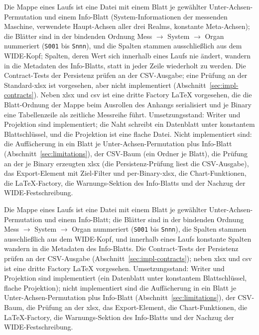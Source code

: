 \begin{nurlang}
Die Mappe eines Laufs ist eine Datei mit einem Blatt je gewählter Unter-Achsen-Permutation und einem
Info-Blatt (System-Informationen der messenden Maschine, verwendete Haupt-Achsen aller drei Realms,
konstante Meta-Achsen); die Blätter sind in der bindenden Ordnung Mess $\to$ System $\to$ Organ
nummeriert (\texttt{S001} bis \texttt{Snnn}), und die Spalten stammen ausschließlich aus dem
WIDE-Kopf; Spalten, deren Wert sich innerhalb eines Laufs nie ändert, wandern in die Metadaten des
Info-Blatts, statt in jeder Zeile wiederholt zu werden. Die Contract-Tests der Persistenz prüfen an der
CSV-Ausgabe; eine Prüfung an der Standard-xlsx ist vorgesehen, aber nicht implementiert
(Abschnitt~\ref{sec:impl-contracts}). Neben xlsx und csv ist
eine dritte Factory LaTeX vorgesehen, die die Blatt-Ordnung der Mappe beim Ausrollen des Anhangs
serialisiert und je Binary eine Tabellenzeile als zeitliche Messreihe führt. Umsetzungsstand:
Writer und Projektion sind implementiert; die Naht schreibt ein Datenblatt unter konstantem Blattschlüssel,
und die Projektion ist eine flache Datei. Nicht implementiert sind: die Auffächerung in ein Blatt je
Unter-Achsen-Permutation plus Info-Blatt (Abschnitt~\ref{sec:limitations}), der CSV-Baum (ein Ordner je
Blatt), die Prüfung an der je Binary erzeugten xlsx (die Persistenz-Prüfung liest die CSV-Ausgabe), das
Export-Element mit Ziel-Filter und per-Binary-xlsx, die Chart-Funktionen, die LaTeX-Factory, die
Warnungs-Sektion des Info-Blatts und der Nachzug der WIDE-Festschreibung.
\end{nurlang}
\begin{nurkurz}
Die Mappe eines Laufs ist eine Datei mit einem Blatt je gewählter Unter-Achsen-Permutation und einem
Info-Blatt; die Blätter sind in der bindenden Ordnung Mess $\to$ System $\to$ Organ nummeriert
(\texttt{S001} bis \texttt{Snnn}), die Spalten stammen ausschließlich aus dem WIDE-Kopf, und innerhalb
eines Laufs konstante Spalten wandern in die Metadaten des Info-Blatts. Die Contract-Tests der Persistenz
prüfen an der CSV-Ausgabe (Abschnitt~\ref{sec:impl-contracts}); neben xlsx und csv ist eine dritte Factory
LaTeX vorgesehen. Umsetzungsstand:
Writer und Projektion sind implementiert (ein Datenblatt unter konstantem Blattschlüssel, flache
Projektion); nicht implementiert sind die Auffächerung in ein Blatt je Unter-Achsen-Permutation plus
Info-Blatt (Abschnitt~\ref{sec:limitations}), der CSV-Baum, die Prüfung an der xlsx, das Export-Element,
die Chart-Funktionen, die LaTeX-Factory, die Warnungs-Sektion des Info-Blatts und der Nachzug der
WIDE-Festschreibung.
\end{nurkurz}

